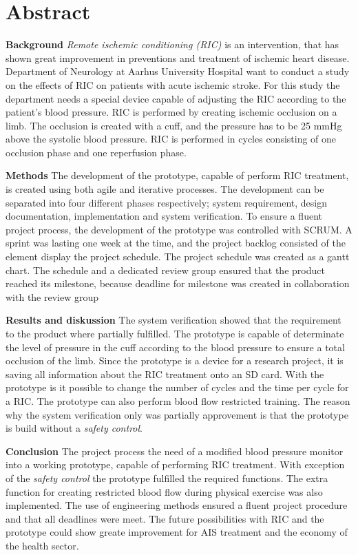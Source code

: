 \chapter*{Abstract}
\textbf{Background} \textit{Remote ischemic conditioning (RIC)} is an intervention, that has shown great improvement in preventions and treatment of ischemic heart disease. Department of Neurology at Aarhus University Hospital want to conduct a study on the effects of RIC on patients with acute ischemic stroke. For this study the department needs a special device capable of adjusting the RIC according to the patient's blood pressure. RIC is performed by creating ischemic occlusion on a limb. The occlusion is created with a cuff, and the pressure has to be 25 mmHg above the systolic blood pressure. RIC is performed in cycles consisting of one occlusion phase and one reperfusion phase. 

\textbf{Methods} The development of the prototype, capable of perform RIC treatment, is created using both agile and iterative processes. The development can be separated into four different phases respectively; system requirement, design documentation, implementation and system verification. To ensure a fluent project process, the development of the prototype was controlled with SCRUM. A sprint was lasting one week at the time, and the project backlog consisted of the element display the project schedule. The project schedule was created as a gantt chart. The schedule and a dedicated review group ensured that the product reached its milestone, because deadline for milestone was created in collaboration with the review group 

\textbf{Results and diskussion} The system verification showed that the requirement to the product where partially fulfilled. The prototype is capable of determinate the level of pressure in the cuff according to the blood pressure to ensure a total occlusion of the limb. Since the prototype is a device for a research project, it is saving all information about the RIC treatment onto an SD card. With the prototype is it possible to change the number of cycles and the time per cycle for a RIC. The prototype can also perform blood flow restricted training. The reason why the system verification only was partially approvement is that the prototype is build without a \textit{safety control}. 

\textbf{Conclusion}
The project process the need of a modified blood pressure monitor into a working prototype, capable of performing RIC treatment. With exception of the \textit{safety control} the prototype fulfilled the required functions. The extra function for creating restricted blood flow during physical exercise was also implemented. The use of engineering methods ensured a fluent project procedure and that all deadlines were meet. The future possibilities with RIC and the prototype could show greate improvement for AIS treatment and the economy of the health sector. 